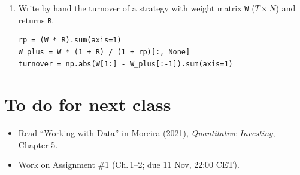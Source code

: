\documentclass[11pt,a4paper]{report}
\begin{document}
\begin{enumerate}
\begin{lstlisting}
T = len(a)
sa, sb = a.mean()/a.std(ddof=1), b.mean()/b.std(ddof=1)
rho = np.corrcoef(a, b)[0, 1]
var = (2 - 2*rho + 0.5*(sa**2 + sb**2 - 2*sa*sb*rho**2)) / T
z = (sa - sb) / np.sqrt(var)
p = 2 * stats.norm.sf(abs(z))
\end{lstlisting}
  \item Write by hand the turnover of a strategy with weight matrix \texttt{W} ($T\times N$) and returns \texttt{R}.
\begin{lstlisting}
rp = (W * R).sum(axis=1)
W_plus = W * (1 + R) / (1 + rp)[:, None]
turnover = np.abs(W[1:] - W_plus[:-1]).sum(axis=1)
\end{lstlisting}
\end{enumerate}

\section{To do for next class}
\begin{itemize}
  \item Read ``Working with Data'' in Moreira (2021), \emph{Quantitative Investing}, Chapter 5.
  \item Work on Assignment \#1 (Ch.\,1--2; due 11 Nov, 22:00 CET).
\end{itemize}
\end{document}
